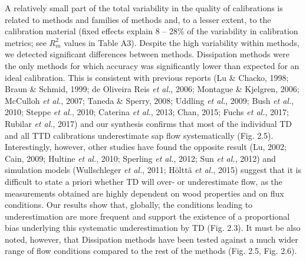 \documentclass[11pt,twoside]{reedthesis}
\begin{document}
A relatively small part of the total variability in the quality of
calibrations is related to methods and families of methods and, to a
lesser extent, to the calibration material (fixed effects explain 8 --
28\% of the variability in calibration metrics; see \(R^2_m\) values in
Table A3). Despite the high variability within methods, we detected
significant differences between methods. Dissipation methods were the
only methods for which accuracy was significantly lower than expected
for an ideal calibration. This is consistent with previous reports (Lu
\& Chacko, 1998; Braun \& Schmid, 1999; de Oliveira Reis \emph{et al.},
2006; Montague \& Kjelgren, 2006; McCulloh \emph{et al.}, 2007; Taneda
\& Sperry, 2008; Uddling \emph{et al.}, 2009; Bush \emph{et al.}, 2010;
Steppe \emph{et al.}, 2010; Caterina \emph{et al.}, 2013; Chan, 2015;
Fuchs \emph{et al.}, 2017; Rubilar \emph{et al.}, 2017) and our
synthesis confirms that most of the individual TD and all TTD
calibrations underestimate sap flow systematically (Fig. 2.5).
Interestingly, however, other studies have found the opposite result
(Lu, 2002; Cain, 2009; Hultine \emph{et al.}, 2010; Sperling \emph{et
al.}, 2012; Sun \emph{et al.}, 2012) and simulation models (Wullschleger
\emph{et al.}, 2011; Hölttä \emph{et al.}, 2015) suggest that it is
difficult to state a priori whether TD will over- or underestimate flow,
as the measurements obtained are highly dependent on wood properties and
on flux conditions. Our results show that, globally, the conditions
leading to underestimation are more frequent and support the existence
of a proportional bias underlying this systematic underestimation by TD
(Fig. 2.3). It must be also noted, however, that Dissipation methods
have been tested against a much wider range of flow conditions compared
to the rest of the methods (Fig. 2.5, Fig. 2.6).\par
\end{document}
